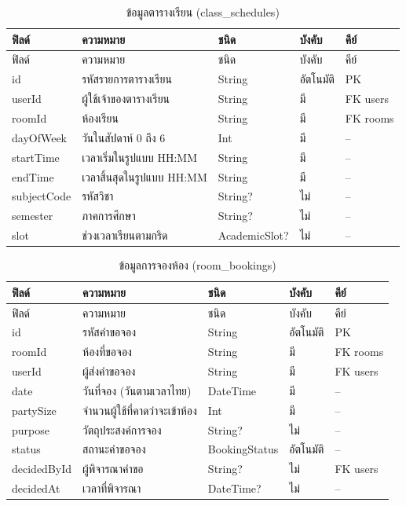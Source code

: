 \documentclass[14pt,a4paper,oneside]{extreport}
\begin{document}
{\begin{longtable}{L{29mm}L{56mm}L{24mm}L{18mm}L{17mm}}
\caption{ข้อมูลตารางเรียน (class\_schedules)}\\\toprule ฟิลด์ & ความหมาย & ชนิด & บังคับ & คีย์\\\midrule\endfirsthead
\toprule ฟิลด์ & ความหมาย & ชนิด & บังคับ & คีย์\\\midrule\endhead
id & รหัสรายการตารางเรียน & String & อัตโนมัติ & PK\\
userId & ผู้ใช้เจ้าของตารางเรียน & String & มี & FK users\\
roomId & ห้องเรียน & String & มี & FK rooms\\
dayOfWeek & วันในสัปดาห์ 0 ถึง 6 & Int & มี & --\\
startTime & เวลาเริ่มในรูปแบบ HH:MM & String & มี & --\\
endTime & เวลาสิ้นสุดในรูปแบบ HH:MM & String & มี & --\\
subjectCode & รหัสวิชา & String? & ไม่ & --\\
semester & ภาคการศึกษา & String? & ไม่ & --\\
slot & ช่วงเวลาเรียนตามกริด & AcademicSlot? & ไม่ & --\\
\bottomrule\end{longtable}

\begin{longtable}{L{29mm}L{56mm}L{24mm}L{18mm}L{17mm}}
\caption{ข้อมูลการจองห้อง (room\_bookings)}\\\toprule ฟิลด์ & ความหมาย & ชนิด & บังคับ & คีย์\\\midrule\endfirsthead
\toprule ฟิลด์ & ความหมาย & ชนิด & บังคับ & คีย์\\\midrule\endhead
id & รหัสคำขอจอง & String & อัตโนมัติ & PK\\
roomId & ห้องที่ขอจอง & String & มี & FK rooms\\
userId & ผู้ส่งคำขอจอง & String & มี & FK users\\
date & วันที่จอง (วันตามเวลาไทย) & DateTime & มี & --\\
partySize & จำนวนผู้ใช้ที่คาดว่าจะเข้าห้อง & Int & มี & --\\
purpose & วัตถุประสงค์การจอง & String? & ไม่ & --\\
status & สถานะคำขอจอง & BookingStatus & อัตโนมัติ & --\\
decidedById & ผู้พิจารณาคำขอ & String? & ไม่ & FK users\\
decidedAt & เวลาที่พิจารณา & DateTime? & ไม่ & --\\
\bottomrule\end{longtable}

}
\end{document}
